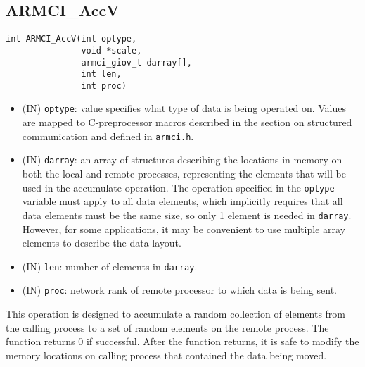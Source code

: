 \documentclass[12pt]{article}
\begin{document}
\subsection{ARMCI\_AccV}
\begin{verbatim}
int ARMCI_AccV(int optype,
               void *scale,
               armci_giov_t darray[],
               int len,
               int proc)
\end{verbatim}
\begin{itemize}
\item (IN) \texttt{optype}: value specifies what type of data is being operated
on. Values are mapped to C-preprocessor macros described in the section on
structured communication and defined in \texttt{armci.h}.
\item (IN) \texttt{darray}: an array of structures describing the
locations in memory on both the local and remote processes, representing the
elements that will be used in the accumulate operation. The operation specified
in the \texttt{optype} variable must apply to all data elements, which
implicitly requires that all data elements must be the same size, so only 1
element is needed in \texttt{darray}. However, for some applications, it may be
convenient to use multiple array elements to describe the data layout.
\item (IN) \texttt{len}: number of elements in \texttt{darray}.
\item (IN) \texttt{proc}: network rank of remote processor to which data is
being sent.
\end{itemize}

This operation is designed to accumulate a random collection of elements from the
calling process to a set of random elements on the remote process. The function
returns 0 if successful.  After the function returns, it is safe to
modify the memory locations on calling process that contained the data being
moved.
\end{document}
